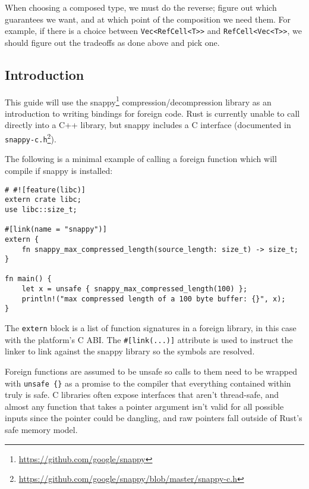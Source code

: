\documentclass[a4paper,]{book}
\renewcommand{\href}[2]{#2\footnote{\url{#1}}}
\begin{document}
When choosing a composed type, we must do the reverse; figure out which
guarantees we want, and at which point of the composition we need them.
For example, if there is a choice between
\texttt{Vec\textless{}RefCell\textless{}T\textgreater{}\textgreater{}}
and
\texttt{RefCell\textless{}Vec\textless{}T\textgreater{}\textgreater{}},
we should figure out the tradeoffs as done above and pick one.


\subsection{Introduction}\label{introduction-1}

This guide will use the \href{https://github.com/google/snappy}{snappy}
compression/decompression library as an introduction to writing bindings
for foreign code. Rust is currently unable to call directly into a C++
library, but snappy includes a C interface (documented in
\href{https://github.com/google/snappy/blob/master/snappy-c.h}{\texttt{snappy-c.h}}).

The following is a minimal example of calling a foreign function which
will compile if snappy is installed:

\begin{verbatim}
# #![feature(libc)]
extern crate libc;
use libc::size_t;

#[link(name = "snappy")]
extern {
    fn snappy_max_compressed_length(source_length: size_t) -> size_t;
}

fn main() {
    let x = unsafe { snappy_max_compressed_length(100) };
    println!("max compressed length of a 100 byte buffer: {}", x);
}
\end{verbatim}

The \texttt{extern} block is a list of function signatures in a foreign
library, in this case with the platform's C ABI. The
\texttt{\#{[}link(...){]}} attribute is used to instruct the linker to
link against the snappy library so the symbols are resolved.

Foreign functions are assumed to be unsafe so calls to them need to be
wrapped with \texttt{unsafe\ \{\}} as a promise to the compiler that
everything contained within truly is safe. C libraries often expose
interfaces that aren't thread-safe, and almost any function that takes a
pointer argument isn't valid for all possible inputs since the pointer
could be dangling, and raw pointers fall outside of Rust's safe memory
model.
\end{document}
